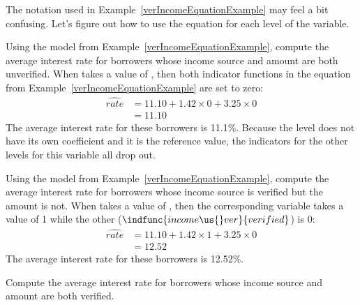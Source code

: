 The notation used in Example~\ref{verIncomeEquationExample}
may feel a bit confusing.
Let's figure out how to use the equation for each level
of the  variable.

\begin{examplewrap}
\begin{nexample}{Using the model from
    Example~\ref{verIncomeEquationExample},
    compute the average interest rate for borrowers
    whose income source and amount are both unverified.}
  When  takes a value of ,
  then both indicator functions in the equation from
  Example~\ref{verIncomeEquationExample}
  are set to zero:
  \begin{align*}
  \widehat{rate} &= 11.10 +
      1.42 \times 0 +
      3.25 \times 0 \\
    &= 11.10
  \end{align*}
  The average interest rate for these borrowers is 11.1\%.
  Because the  level does not have its own
  coefficient and it is the reference value,
  the indicators for the other levels for this variable
  all drop out.
\end{nexample}
\end{examplewrap}

\begin{examplewrap}
\begin{nexample}{Using the model from
    Example~\ref{verIncomeEquationExample},
    compute the average interest rate for borrowers
    whose income source is verified but the amount is not.}
  When  takes a value of
  ,
  then the corresponding variable takes a value of 1
  while the other ($\indfunc{income\us{}ver}{verified}$) is 0:
  \begin{align*}
  \widehat{rate} &= 11.10 +
      1.42 \times 1 +
      3.25 \times 0 \\
    &= 12.52
  \end{align*}
  The average interest rate for these borrowers is 12.52\%.
\end{nexample}
\end{examplewrap}

\begin{exercisewrap}
\begin{nexercise}
Compute the average interest rate for borrowers
whose income source and amount are both verified.\footnotemark
\end{nexercise}
\end{exercisewrap}

